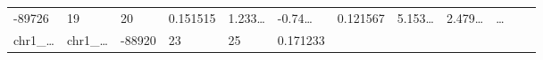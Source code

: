 \documentclass[
]{article}
\begin{document}
\begin{longtable}[]{@{}llllllllllll@{}}
\begin{minipage}[t]{0.06\columnwidth}
-89726\strut
\end{minipage} & \begin{minipage}[t]{0.06\columnwidth}\raggedright
19\strut
\end{minipage} & \begin{minipage}[t]{0.06\columnwidth}\raggedright
20\strut
\end{minipage} & \begin{minipage}[t]{0.06\columnwidth}\raggedright
0.151515\strut
\end{minipage} & \begin{minipage}[t]{0.08\columnwidth}\raggedright
1.233\ldots{}\strut
\end{minipage} & \begin{minipage}[t]{0.06\columnwidth}\raggedright
-0.74\ldots{}\strut
\end{minipage} & \begin{minipage}[t]{0.06\columnwidth}\raggedright
0.121567\strut
\end{minipage} & \begin{minipage}[t]{0.09\columnwidth}\raggedright
5.153\ldots{}\strut
\end{minipage} & \begin{minipage}[t]{0.06\columnwidth}\raggedright
2.479\ldots{}\strut
\end{minipage} & \begin{minipage}[t]{0.02\columnwidth}\raggedright
\ldots{}\strut
\end{minipage}\tabularnewline
\begin{minipage}[t]{0.06\columnwidth}\raggedright
chr1\_\ldots{}\strut
\end{minipage} & \begin{minipage}[t]{0.06\columnwidth}\raggedright
chr1\_\ldots{}\strut
\end{minipage} & \begin{minipage}[t]{0.06\columnwidth}\raggedright
-88920\strut
\end{minipage} & \begin{minipage}[t]{0.06\columnwidth}\raggedright
23\strut
\end{minipage} & \begin{minipage}[t]{0.06\columnwidth}\raggedright
25\strut
\end{minipage} & \begin{minipage}[t]{0.06\columnwidth}\raggedright
0.171233\strut
\end{minipage} & \begin{minipage}[t]{0.08\columnwidth}\raggedright

\end{minipage}
\end{longtable}
\end{document}
